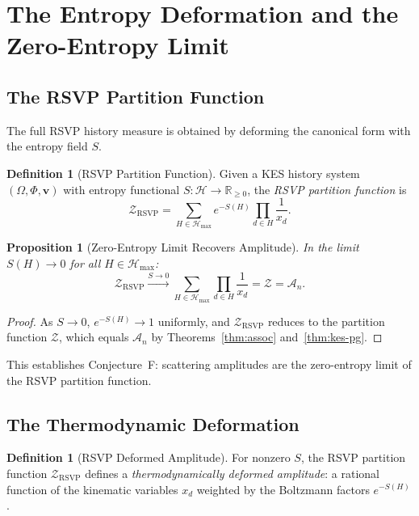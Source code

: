 \documentclass[12pt, oneside]{amsart}
\theoremstyle{plain}
\newtheorem{proposition}[theorem]{Proposition}
\theoremstyle{definition}
\newtheorem{definition}[theorem]{Definition}
\theoremstyle{remark}
\newcommand{\R}{\mathbb{R}}
\newcommand{\Phif}{\Phi}   %
\newcommand{\Sf}{S}         %
\newcommand{\OmKS}{\Omega}
\newcommand{\Amp}{\mathcal{A}}
\newcommand{\ZRSVP}{\mathcal{Z}_{\mathrm{RSVP}}}
\newcommand{\Hmax}{\mathcal{H}_{\max}}
\begin{document}
\section{The Entropy Deformation and the Zero-Entropy Limit}
\label{sec:entropy}

\subsection{The RSVP Partition Function}

The full RSVP history measure is obtained by deforming the canonical form with the entropy field $\Sf$.

\begin{definition}[RSVP Partition Function]
\label{def:rsvp-Z}
Given a KES history system $(\OmKS, \Phif, \mathbf{v})$ with entropy functional $\Sf: \mathcal{H} \to \R_{\geq 0}$, the \emph{RSVP partition function} is
\begin{equation}
\label{eq:ZRSVP}
  \ZRSVP = \sum_{H \in \Hmax} e^{-\Sf(H)} \prod_{d \in H} \frac{1}{x_d}.
\end{equation}
\end{definition}

\begin{proposition}[Zero-Entropy Limit Recovers Amplitude]
In the limit $\Sf(H) \to 0$ for all $H \in \Hmax$:
\[
  \ZRSVP \xrightarrow{\Sf \to 0} \sum_{H \in \Hmax} \prod_{d \in H} \frac{1}{x_d} = \mathcal{Z} = \Amp_n.
\]
\end{proposition}

\begin{proof}
As $\Sf \to 0$, $e^{-\Sf(H)} \to 1$ uniformly, and $\ZRSVP$ reduces to the partition function $\mathcal{Z}$, which equals $\Amp_n$ by Theorems~\ref{thm:assoc} and~\ref{thm:kes-pg}.
\end{proof}

This establishes Conjecture~F: scattering amplitudes are the zero-entropy limit of the RSVP partition function.

\subsection{The Thermodynamic Deformation}

\begin{definition}[RSVP Deformed Amplitude]
For nonzero $\Sf$, the RSVP partition function $\ZRSVP$ defines a \emph{thermodynamically deformed amplitude}: a rational function of the kinematic variables $x_d$ weighted by the Boltzmann factors $e^{-\Sf(H)}$.
\end{definition}
\end{document}
